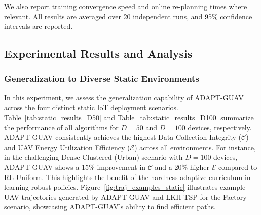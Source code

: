 \documentclass[10pt,conference,letterpaper]{IEEEtran}
\begin{document}
We also report training convergence speed and online re-planning times where relevant. All results are averaged over 20 independent runs, and 95\% confidence intervals are reported.

\subsection{Experimental Results and Analysis}
\label{subsec:results_analysis}

\subsubsection{Generalization to Diverse Static Environments}
\label{ssubsec:exp_static}
In this experiment, we assess the generalization capability of ADAPT-GUAV across the four distinct static IoT deployment scenarios. Table~\ref{tab:static_results_D50} and Table~\ref{tab:static_results_D100} summarize the performance of all algorithms for $D=50$ and $D=100$ devices, respectively. ADAPT-GUAV consistently achieves the highest Data Collection Integrity ($\mathcal{C}$) and UAV Energy Utilization Efficiency ($\mathcal{E}$) across all environments. For instance, in the challenging Dense Clustered (Urban) scenario with $D=100$ devices, ADAPT-GUAV shows a 15\% improvement in $\mathcal{C}$ and a 20\% higher $\mathcal{E}$ compared to RL-Uniform. This highlights the benefit of the hardness-adaptive curriculum in learning robust policies. Figure~\ref{fig:traj_examples_static} illustrates example UAV trajectories generated by ADAPT-GUAV and LKH-TSP for the Factory scenario, showcasing ADAPT-GUAV's ability to find efficient paths.
\end{document}
